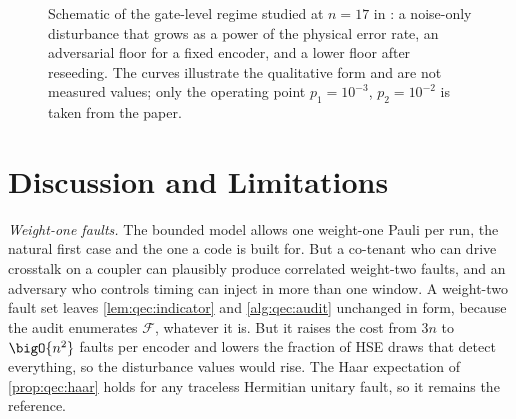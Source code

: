 \begin{figure}[htbp]
\centering
{}
\caption{Schematic of the gate-level regime studied at $n=17$ in \cite{guo2026qecaudit}: a noise-only disturbance that grows as a power of the physical error rate, an adversarial floor for a fixed encoder, and a lower floor after reseeding. The curves illustrate the qualitative form and are not measured values; only the operating point $p_1=10^{-3}$, $p_2=10^{-2}$ is taken from the paper.}
\label{fig:qec:stim}
\end{figure}

\section{Discussion and Limitations}\label{sec:qec:discussion}

\emph{Weight-one faults.} The bounded model allows one weight-one Pauli per run, the natural first case and the one a code is built for. But a co-tenant who can drive crosstalk on a coupler can plausibly produce correlated weight-two faults, and an adversary who controls timing can inject in more than one window. A weight-two fault set leaves \cref{lem:qec:indicator} and \cref{alg:qec:audit} unchanged in form, because the audit enumerates $\mathcal{F}$, whatever it is. But it raises the cost from $3n$ to $\bigO{n^{2}}$ faults per encoder and lowers the fraction of HSE draws that detect everything, so the disturbance values would rise. The Haar expectation of \cref{prop:qec:haar} holds for any traceless Hermitian unitary fault, so it remains the reference.

